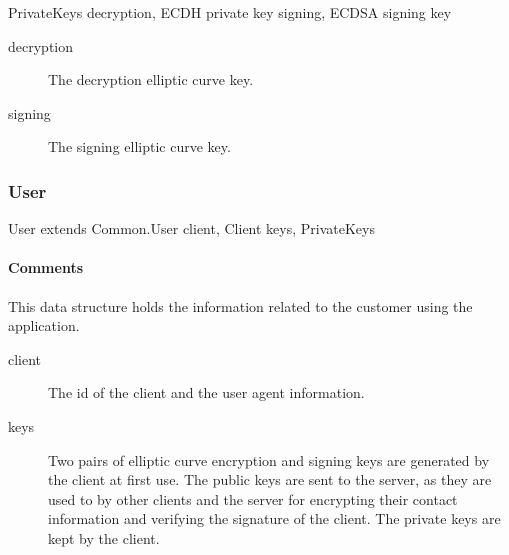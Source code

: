 \documentclass[a4paper,10pt]{article}
\begin{document}
\begin{verbbox}
PrivateKeys
{
  decryption, ECDH private key
  signing, ECDSA signing key
}
\end{verbbox}
\begin{center}
\theverbbox
\end{center}

\begin{inparaitem}[ ]
 \item \infrastructure
\end{inparaitem}

\SpecialItem
\begin{description}
 \item[decryption] The decryption elliptic curve key.
 \item[signing] The signing elliptic curve key.
\end{description}

\subsubsection{User}

\begin{verbbox}
User extends Common.User
{
  client, Client
  keys, PrivateKeys
}
\end{verbbox}
\begin{center}
\theverbbox
\end{center}

\begin{inparaitem}[ ]
 \item \unique
 \item \secure
 \item \persistent
\end{inparaitem}

\paragraph*{Comments}
This data structure holds the information related to the customer using the application.

\SpecialItem
\begin{description}
 \item[client] The id of the client and the user agent information.
 \item[keys] Two pairs of elliptic curve encryption and signing keys are generated by the client at first use. The public keys are sent to the server, as they are used to by other 
clients and the server for encrypting their contact information and verifying the signature of the client. The private keys are kept by the client.
\end{description}
\end{document}
